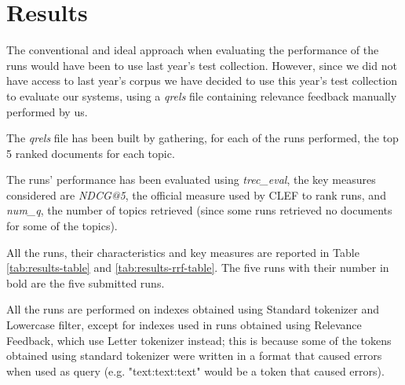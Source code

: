 \section{Results}
\label{sec:results}

The conventional and ideal approach when evaluating the performance of the runs would have been to use last year's test collection. However, since we did not have access to last year's corpus we have decided to use this year's test collection to evaluate our systems, using a \textit{qrels} file containing relevance feedback manually performed by us.

The \textit{qrels} file has been built by gathering, for each of the runs performed, the top 5 ranked documents for each topic.

The runs' performance has been evaluated using \textit{trec\_eval}, the key measures considered are \textit{NDCG@5}, the official measure used by CLEF to rank runs, and \textit{num\_q}, the number of topics retrieved (since some runs retrieved no documents for some of the topics).

All the runs, their characteristics and key measures are reported in Table \ref{tab:results-table} and \ref{tab:results-rrf-table}. The five runs with their number in bold are the five submitted runs.

All the runs are performed on indexes obtained using Standard tokenizer and Lowercase filter, except for indexes used in runs obtained using Relevance Feedback, which use Letter tokenizer instead; this is because some of the tokens obtained using standard tokenizer were written in a format that caused errors when used as query (e.g. "text:text:text" would be a token that caused errors).

